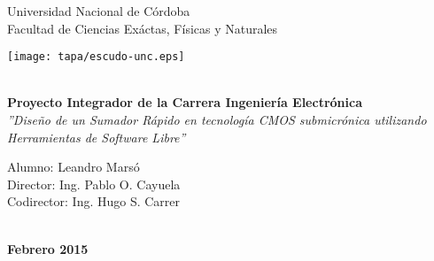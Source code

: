 \begin{titlepage}
\pagestyle{empty}       

\begin{center}
	\Huge{Universidad Nacional de Córdoba\\}
	\Large {Facultad de Ciencias Exáctas, Físicas y Naturales}\\

\vspace{1cm}

\texttt{[image: tapa/escudo-unc.eps]}

\vspace{0.1cm}

	\Huge \textbf{\\[2ex]Proyecto Integrador de la Carrera Ingeniería Electrónica}
	\Large \textsl{\\[2ex] ''Diseño de un Sumador Rápido en tecnología CMOS submicrónica utilizando Herramientas de Software Libre''}

\vspace{1cm}
	\begin{normalsize} 
	Alumno: Leandro Marsó \\
	Director: Ing. Pablo O. Cayuela \\
	Codirector: Ing. Hugo S. Carrer
	\end{normalsize}
	\begin{large}	
	\vspace{0.5cm}
	\\ \textbf{Febrero 2015}
	\end{large}

\end{center}

\vspace{0.5cm}

\begin{center}

\end{center}

\hfuzz=50pt
\end{titlepage}

